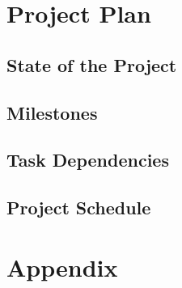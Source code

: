 \documentclass{article}
\begin{document}
\section{Project Plan}
\subsection{State of the Project} %
\subsection{Milestones}
\subsection{Task Dependencies}
\subsection{Project Schedule} %

\section{Appendix}
\end{document}

